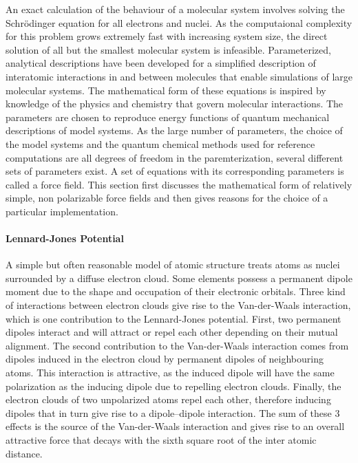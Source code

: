 \documentclass[english, a4paper, 12pt, titlepage, draft]{article}
\begin{document}
An exact calculation of the behaviour of a molecular system involves solving the Schr\"odinger equation for all electrons and nuclei.
As the computaional complexity for this problem grows extremely fast with increasing system size, the direct solution of all but the smallest molecular system is infeasible.
Parameterized, analytical descriptions have been developed for a simplified description of interatomic interactions in and between molecules that enable simulations of large molecular systems.
The mathematical form of these equations is inspired by knowledge of the physics and chemistry that govern molecular interactions.
The parameters are chosen to reproduce energy functions of quantum mechanical descriptions of model systems.
As the large number of parameters, the choice of the model systems and the quantum chemical methods used for reference computations are all degrees of freedom in the paremterization, several different sets of parameters exist.
A set of equations with its corresponding parameters is called a force field.
This section first discusses the mathematical form of relatively simple, non polarizable force fields and then gives reasons for the choice of a particular implementation.

\paragraph{Lennard-Jones Potential}
A simple but often reasonable model of atomic structure treats atoms as nuclei surrounded by a diffuse electron cloud.
Some elements possess a permanent dipole moment due to the shape and occupation of their electronic orbitals.
Three kind of interactions between electron clouds give rise to the Van-der-Waals interaction, which is one contribution to the Lennard-Jones potential.
First, two permanent dipoles interact and will attract or repel each other depending on their mutual alignment.
The second contribution to the Van-der-Waals interaction comes from dipoles induced in the electron cloud by permanent dipoles of neighbouring atoms.
This interaction is attractive, as the induced dipole will have the same polarization as the inducing dipole due to repelling electron clouds.
Finally, the electron clouds of two unpolarized atoms repel each other, therefore inducing dipoles that in turn give rise to a dipole--dipole interaction.
The sum of these 3 effects is the source of the Van-der-Waals interaction and gives rise to an overall attractive force that decays with the sixth square root of the inter atomic distance.
\end{document}
